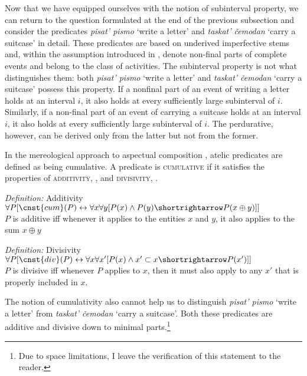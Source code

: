 \documentclass[output=paper,
]{langscibook}
\begin{document}
Now that we have equipped ourselves with the notion of subinterval property, we can return to the question formulated at the end of the previous subsection and consider the predicates \textit{pisat’ pismo} `write a letter’ and \textit{taskat’ čemodan} `carry a suitcase’ in detail. These predicates are based on underived imperfective stems and, within the assumption introduced in , denote non-final parts of complete events and belong to the class of activities. The subinterval property is not what distinguishes them: both \textit{pisat’ pismo} `write a letter’ and \textit{taskat’ čemodan} `carry a suitcase’ possess this property. If a nonfinal part of an event of writing a letter holds at an interval $i$, it also holds at every sufficiently large subinterval of $i$. Similarly, if a non-final part of an event of carrying a suitcase holds at an interval $i$, it also holds at every sufficiently large subinterval of $i$. The perdurative, however, can be derived only from the latter but not from the former. 

In the mereological approach to aspectual composition \citep{krifka1989nominal,krifka1989nominal, krifka1992nominal,krifka1998origins}, atelic predicates are defined as being cumulative. A predicate is \textsc{cumulative} if it satisfies the properties of \textsc{additivity}, , and \textsc{divisivity}, .

\ea \label{ex:naumov:26}
\textit{Definition:} Additivity\smallskip\\
$\forall P[\cnst{cum}(P) \leftrightarrow \forall x \forall y[P(x) \wedge P(y) \shortrightarrow P(x \oplus y)]]$ \\
$P$ is additive iff whenever it applies to the entities $x$ and $y$, it also applies to the sum $x \oplus y$
\z

\ea \label{ex:naumov:27}
\textit{Definition:} Divisivity\smallskip\\
$\forall P[\cnst{div}(P) \leftrightarrow \forall x \forall x' [P(x) \wedge x' \subset x \shortrightarrow P(x')]]$ \\
$P$ is divisive iff whenever $P$ applies to $x$, then it must also apply to any $x'$ that is properly included in $x$.
\z

\noindent The notion of cumulativity also cannot help us to distinguish \textit{pisat’ pismo} `write a letter’ from \textit{taskat’ čemodan} `carry a suitcase’. Both these predicates are additive and divisive down to minimal parts.\footnote{Due to space limitations, I leave the verification of this statement to the reader.}
\end{document}
